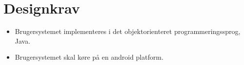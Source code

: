 \section{Designkrav}
\begin{itemize}
\item Brugersystemet implementeres i det objektorienteret programmeringssprog, Java.
\item Brugersystemet skal køre på en android platform.

\end{itemize}

